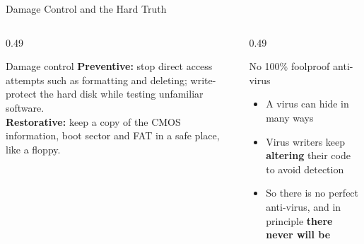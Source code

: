 \documentclass[aspectratio=169,11pt,xcolor={table}]{beamer}
\begin{document}
\begin{frame}{Damage Control and the Hard Truth}
  \begin{columns}[T]
    \begin{column}{0.49\textwidth}
      \begin{block}{Damage control}
        \small
        \textbf{Preventive:} stop direct access attempts such as formatting and deleting; write-protect the hard disk while testing unfamiliar software.\\[3pt]
        \textbf{Restorative:} keep a copy of the CMOS information, boot sector and FAT in a safe place, like a floppy.
      \end{block}
    \end{column}
    \begin{column}{0.49\textwidth}
      \begin{alertblock}{No 100\% foolproof anti-virus}
        \small
        \begin{itemize}\setlength{\itemsep}{2pt}
          \item A virus can hide in many ways
          \item Virus writers keep \textbf{altering} their code to avoid detection
          \item So there is no perfect anti-virus, and in principle \textbf{there never will be}
        \end{itemize}
      \end{alertblock}
    \end{column}
  \end{columns}
  \vspace{3mm}
  \centering
\end{frame}
\end{document}
